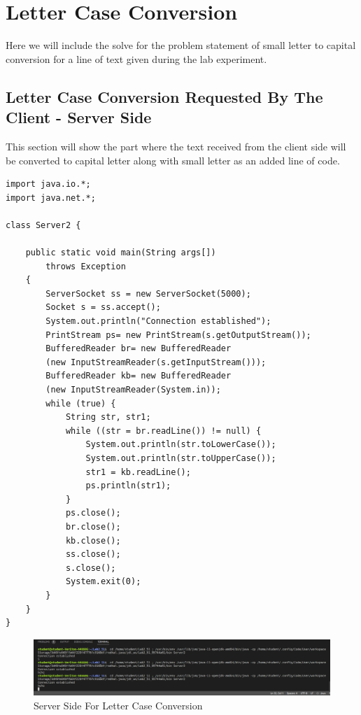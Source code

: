 \documentclass[11pt]{article}
\begin{document}
\section{Letter Case Conversion}
Here we will include the solve for the problem statement of small letter to capital conversion for a line of text given during the lab experiment.
\subsection{Letter Case Conversion Requested By The Client - Server Side }
This section will show the part where the text received from the client side will be converted to capital letter along with small letter as an added line of code.
\
\begin{verbatim}
import java.io.*;
import java.net.*;

class Server2 {

	public static void main(String args[])
		throws Exception
	{
		ServerSocket ss = new ServerSocket(5000);
		Socket s = ss.accept();
		System.out.println("Connection established");
		PrintStream ps= new PrintStream(s.getOutputStream());
		BufferedReader br= new BufferedReader
		(new InputStreamReader(s.getInputStream()));
		BufferedReader kb= new BufferedReader
		(new InputStreamReader(System.in));
		while (true) {
			String str, str1;
			while ((str = br.readLine()) != null) {
				System.out.println(str.toLowerCase());
				System.out.println(str.toUpperCase());
				str1 = kb.readLine();
				ps.println(str1);
			}
			ps.close();
			br.close();
			kb.close();
			ss.close();
			s.close();
			System.exit(0);
		} 
	}
}

\end{verbatim}

\begin{figure}[!h]
\centering
\includegraphics[width=\textwidth]{case_server.png}
\caption{Server Side For Letter Case Conversion}
\end{figure}
\end{document}
